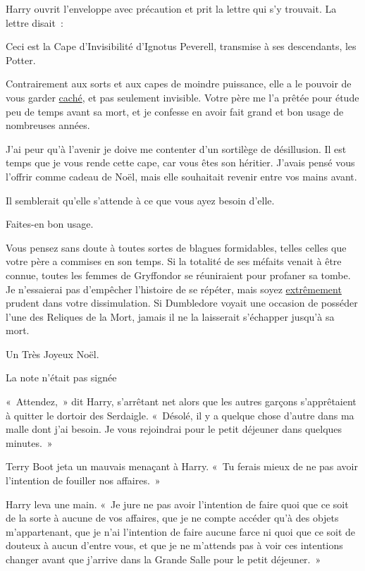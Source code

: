 Harry ouvrit l'enveloppe avec précaution et prit la lettre qui s'y trouvait.
La lettre disait~:
\begin{writtenNote}

Ceci est la Cape d'Invisibilité d'Ignotus Peverell, transmise à ses descendants, les Potter.
\strut Contrairement aux sorts et aux capes de moindre puissance, elle a le pouvoir de vous garder \underline{caché}, et pas seulement invisible.
Votre père me l'a prêtée pour étude peu de temps avant sa mort, et je confesse en avoir fait grand et bon usage de nombreuses années.

J'ai peur qu'à l'avenir je doive me contenter d'un sortilège de désillusion.
Il est temps que je vous rende cette cape, car vous êtes son héritier.
J'avais pensé vous l'offrir comme cadeau de Noël, mais elle souhaitait revenir entre vos mains avant. \strut 
Il semblerait qu'elle s'attende à ce que vous ayez besoin d'elle. \strut
Faites-en bon usage.

Vous pensez sans doute à toutes sortes de blagues formidables, telles celles que votre père a commises en son temps.
Si la totalité de ses méfaits venait à être connue, toutes les femmes de Gryffondor se réuniraient pour profaner sa tombe.
Je n'essaierai pas d'empêcher l'histoire de se répéter, mais soyez \underline{extrêmement} prudent dans votre dissimulation.
Si Dumbledore voyait une occasion de posséder l'une des Reliques de la Mort, jamais il ne la laisserait s'échapper jusqu'à sa mort.

Un Très Joyeux Noël.

\end{writtenNote}

La note n'était pas signée

\later

«~Attendez,~» dit Harry, s'arrêtant net alors que les autres garçons s'apprêtaient à quitter le dortoir des Serdaigle. «~Désolé, il y a quelque chose d'autre dans ma malle dont j'ai besoin. Je vous rejoindrai pour le petit déjeuner dans quelques minutes.~»

Terry Boot jeta un mauvais menaçant à Harry. «~Tu ferais mieux de ne pas avoir l'intention de fouiller nos affaires.~»

Harry leva une main. «~Je jure ne pas avoir l'intention de faire quoi que ce soit de la sorte à aucune de vos affaires, que je ne compte accéder qu'à des objets m'appartenant, que je n'ai l'intention de faire aucune farce ni quoi que ce soit de douteux à aucun d'entre vous, et que je ne m'attends pas à voir ces intentions changer avant que j'arrive dans la Grande Salle pour le petit déjeuner.~»

